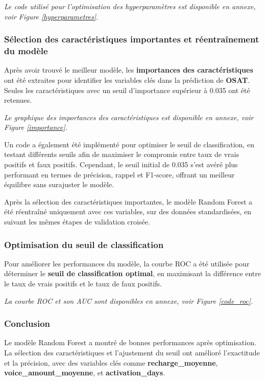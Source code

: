 \textit{Le code utilisé pour l'optimisation des hyperparamètres est disponible en annexe, voir Figure \ref{hyperparametres}.}

\subsubsection{Sélection des caractéristiques importantes et réentraînement du modèle}
Après avoir trouvé le meilleur modèle, les \textbf{importances des caractéristiques} ont été extraites pour identifier les variables clés dans la prédiction de \textbf{OSAT}. Seules les caractéristiques avec un seuil d'importance supérieur à 0.035 ont été retenues.

\textit{Le graphique des importances des caractéristiques est disponible en annexe, voir Figure \ref{importance}.}

Un code a également été implémenté pour optimiser le seuil de classification, en testant différents seuils afin de maximiser le compromis entre taux de vrais positifs et faux positifs. Cependant, le seuil initial de 0.035 s'est avéré plus performant en termes de précision, rappel et F1-score, offrant un meilleur équilibre sans surajuster le modèle.

Après la sélection des caractéristiques importantes, le modèle Random Forest a été réentraîné uniquement avec ces variables, sur des données standardisées, en suivant les mêmes étapes de validation croisée.

\subsubsection{Optimisation du seuil de classification}
Pour améliorer les performances du modèle, la courbe ROC a été utilisée pour déterminer le \textbf{seuil de classification optimal}, en maximisant la différence entre le taux de vrais positifs et le taux de faux positifs.

\textit{La courbe ROC et son AUC sont disponibles en annexe, voir Figure \ref{code_roc}.}

\subsubsection{Conclusion}
Le modèle Random Forest a montré de bonnes performances après optimisation. La sélection des caractéristiques et l'ajustement du seuil ont amélioré l'exactitude et la précision, avec des variables clés comme \textbf{recharge\_moyenne}, \textbf{voice\_amount\_moyenne}, et \textbf{activation\_days}.

